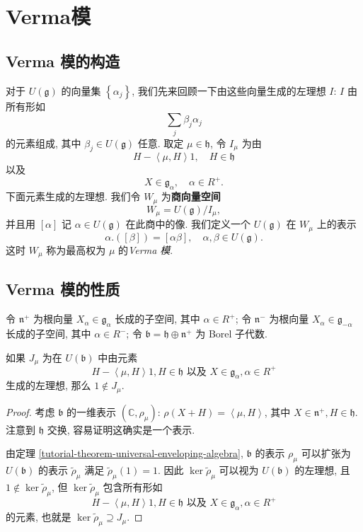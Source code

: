 \section{Verma模}

\subsection{Verma 模的构造}

对于 \( U(\mathfrak{g}) \) 的向量集 \( \left\lbrace \alpha_j \right\rbrace \),
我们先来回顾一下由这些向量生成的左理想 \( I \): \( I \) 由所有形如
\[
  \sum_j \beta_j \alpha_j
\]
的元素组成, 其中 \( \beta_j \in U(\mathfrak{g}) \) 任意. 取定 \( \mu \in
\mathfrak{h} \), 令 \( I_{\mu} \) 为由
\[
  H - \left\langle \mu, H \right\rangle 1,\quad H \in \mathfrak{h}
\]
以及
\[
  X \in \mathfrak{g}_\alpha,\quad \alpha \in R^+.
\]
下面元素生成的左理想. 我们令 \( W_{\mu} \) 为\textbf{商向量空间}
\[
  W_{\mu} = U(\mathfrak{g}) / I_{\mu},
\]
并且用 \( [\alpha] \) 记 \( \alpha \in U(\mathfrak{g}) \) 在此商中的像.
我们定义一个 \( U(\mathfrak{g}) \) 在 \( W_{\mu} \) 上的表示
\[
  \alpha.([\beta]) = [\alpha \beta],\quad \alpha, \beta \in U(\mathfrak{g}).
\]
这时 \( W_{\mu} \) 称为最高权为 \( \mu \) 的\emph{Verma 模}.


\subsection{Verma 模的性质}

令 \( \mathfrak{n}^+ \) 为根向量 \( X_\alpha \in \mathfrak{g}_\alpha \)
长成的子空间, 其中 \( \alpha \in R^+ \); 令 \( \mathfrak{n}^- \) 为根向量 \(
X_\alpha \in \mathfrak{g}_{-\alpha} \) 长成的子空间, 其中 \( \alpha \in R^- \);
令 \( \mathfrak{b} = \mathfrak{h} \oplus \mathfrak{n}^+ \) 为 Borel 子代数.

\begin{lemma}
  \label{tutorial-lemma-Verma-properties}
  如果 \( J_{\mu} \) 为在 \( U(\mathfrak{b}) \) 中由元素
  \[
    H - \left\langle \mu, H \right\rangle 1, H \in \mathfrak{h} \text{ 以及 } X
    \in \mathfrak{g}_\alpha, \alpha \in R^+
  \]
  生成的左理想, 那么 \( 1 \notin J_{\mu} \).
\end{lemma}
\begin{proof}
  考虑 \( \mathfrak{b} \) 的一维表示 \( (\mathbb{C}, \rho_{\mu}) \): \( \rho(X + H) =
  \left\langle \mu, H \right\rangle\), 其中 \( X \in \mathfrak{n}^+, H \in
  \mathfrak{h} \). 注意到 \( \mathfrak{h} \) 交换, 容易证明这确实是一个表示.

  由定理 \ref{tutorial-theorem-universal-enveloping-algebra}, \( \mathfrak{b} \)
  的表示 \( \rho_{\mu} \) 可以扩张为 \( U(\mathfrak{b}) \) 的表示 \(
  \widetilde{\rho}_{\mu} \) 满足 \( \widetilde{\rho}_{\mu}(1) = 1 \).
  因此 \( \operatorname{ker} \widetilde{\rho}_{\mu} \) 可以视为 \(
  U(\mathfrak{b}) \) 的左理想, 且 \( 1 \notin \operatorname{ker}
  \widetilde{\rho}_{\mu} \), 但 \( \operatorname{ker} \widetilde{\rho}_{\mu} \)
  包含所有形如
  \[
    H - \left\langle \mu, H \right\rangle 1, H \in \mathfrak{h} \text{ 以及 } X
    \in \mathfrak{g}_\alpha, \alpha \in R^+
  \]
  的元素, 也就是 \( \operatorname{ker} \widetilde{\rho}_{\mu} \supseteq J_{\mu}
  \).
\end{proof}

